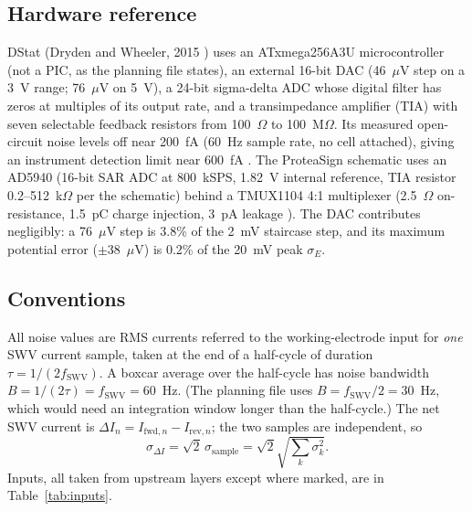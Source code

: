 \documentclass[10pt]{article}
\numberwithin{equation}{section}
\begin{document}
\subsection{Hardware reference}
DStat (Dryden and Wheeler, 2015 \cite{dstat}) uses an ATxmega256A3U microcontroller (not a PIC, as the planning file states),
an external 16-bit DAC (46~$\mu$V step on a 3~V range; 76~$\mu$V on 5~V), a 24-bit sigma-delta ADC whose digital filter has
zeros at multiples of its output rate, and a transimpedance amplifier (TIA) with seven selectable feedback resistors from
100~$\Omega$ to 100~M$\Omega$. Its measured open-circuit noise levels off near 200~fA (60~Hz sample rate, no cell attached),
giving an instrument detection limit near 600~fA \cite{dstat}. The ProteaSign schematic uses an AD5940 \cite{ad5940} (16-bit SAR ADC at
800~kSPS, 1.82~V internal reference, TIA resistor 0.2--512~k$\Omega$ per the schematic) behind a TMUX1104 4:1 multiplexer
(2.5~$\Omega$ on-resistance, 1.5~pC charge injection, 3~pA leakage \cite{tmux}). The DAC contributes negligibly: a
76~$\mu$V step is 3.8\% of the 2~mV staircase step, and its maximum potential error ($\pm$38~$\mu$V) is 0.2\% of the 20~mV
peak $\sigma_E$.

\subsection{Conventions}
All noise values are RMS currents referred to the working-electrode input for \emph{one} SWV current sample, taken at the end
of a half-cycle of duration $\tau = 1/(2f_{\text{SWV}})$. A boxcar average over the half-cycle has noise bandwidth
$B = 1/(2\tau) = f_{\text{SWV}} = 60$~Hz. (The planning file uses $B = f_{\text{SWV}}/2 = 30$~Hz, which would need an
integration window longer than the half-cycle.) The net SWV current is $\Delta I_n = I_{\text{fwd},n} - I_{\text{rev},n}$; the two
samples are independent, so
\begin{equation}
\sigma_{\Delta I} = \sqrt{2}\,\sigma_{\text{sample}} = \sqrt{2}\sqrt{\textstyle\sum_k \sigma_k^{2}} .
\end{equation}
Inputs, all taken from upstream layers except where marked, are in Table~\ref{tab:inputs}.
\end{document}
